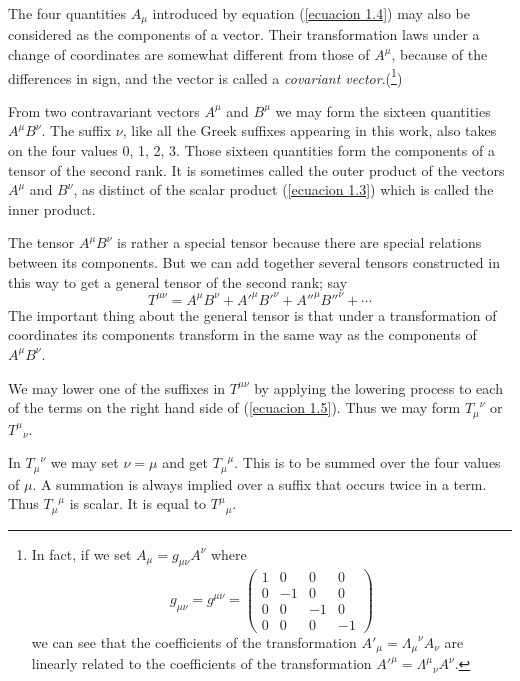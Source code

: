 The four quantities $A_\mu$ introduced by equation (\ref{ecuacion 1.4}) may 
also be considered as the components of a vector. Their transformation laws 
under a change of coordinates are somewhat different from those of $A^\mu$, 
because of the differences in sign, and the vector is called a \emph{covariant 
vector}.(\footnote{
In fact, if we set $A_\mu = g_{\mu\nu} A^\nu$ where
\[
  g_{\mu\nu} = 
  g^{\mu\nu} =
  \left(
    \begin{array}{cccc}
        1 &  0 &  0 &  0 \\
        0 & -1 &  0 &  0 \\
        0 &  0 & -1 &  0 \\
        0 &  0 &  0 & -1
    \end{array}
  \right)
\]
we can see that the coefficients of the transformation ${A'_{\mu}} = 
{\Lambda_\mu}^\nu A_\nu$ are linearly related to the coefficients of the 
transformation ${A'}^\mu = {\Lambda^\mu}_\nu A^\nu$.
})

From two contravariant vectors $A^\mu$ and $B^\mu$ we may form the sixteen 
quantities $A^\mu B^\nu$. The suffix $\nu$, like all the Greek suffixes 
appearing in this work, also takes on the four values 0, 1, 2, 3. Those sixteen 
quantities form the components of a tensor of the second rank. It is sometimes 
called the outer product of the vectors $A^\mu$ and $B^\nu$, as distinct of the 
scalar product (\ref{ecuacion 1.3}) which is called the inner product.

The tensor $A^\mu B^\nu$ is rather a special tensor because there are special 
relations between its components. But we can add together several tensors 
constructed in this way to get a general tensor of the second rank; say
\begin{equation}
 \label{ecuacion 1.5}
 T^{\mu\nu} = A^\mu B^\nu + {A'}^\mu {B'}^\nu + {A''}^\mu {B''}^\nu + \cdots
\end{equation}
The important thing about the general tensor is that under a transformation of 
coordinates its components transform in the same way as the components of $A^\mu 
B^\nu$.

We may lower one of the suffixes in $T^{\mu\nu}$ by applying the lowering 
process to each of the terms on the right hand side of (\ref{ecuacion 1.5}). 
Thus we may form ${T_\mu}^\nu$ or ${T^\mu}_\nu$.

In ${T_\mu}^\nu$ we may set $\nu=\mu$ and get ${T_\mu}^\mu$. This is to be 
summed over the four values of $\mu$. A summation is always implied over a 
suffix that occurs twice in a term. Thus ${T_\mu}^\mu$ is scalar. It is equal to 
${T^\mu}_\mu$.

